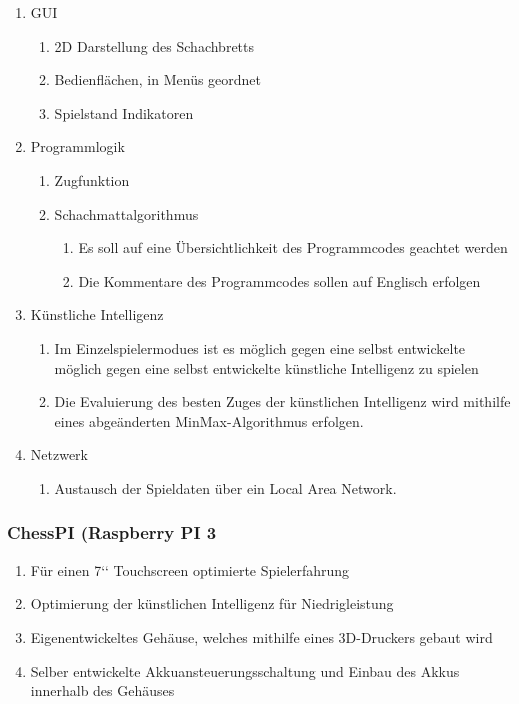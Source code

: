 \documentclass[12pt,a4paper]{article}
\begin{document}
{\begin{enumerate}
	\item{GUI}
	\begin{enumerate}
		\item{2D Darstellung des Schachbretts}
		\item{Bedienflächen, in Menüs geordnet}
		\item{Spielstand Indikatoren}
	\end{enumerate}
	\item{Programmlogik}
	\begin{enumerate}
		\item{Zugfunktion}
		\item{Schachmattalgorithmus}
		\begin{enumerate}
			\item{Es soll auf eine Übersichtlichkeit des Programmcodes geachtet werden}
			\item{Die Kommentare des Programmcodes sollen auf Englisch erfolgen}
		\end{enumerate}
	\end{enumerate}
	\item{Künstliche Intelligenz}
	\begin{enumerate}
		\item{Im Einzelspielermodues ist es möglich gegen eine selbst entwickelte möglich gegen eine selbst entwickelte künstliche Intelligenz zu spielen}
		\item{Die Evaluierung des besten Zuges der künstlichen Intelligenz wird mithilfe eines abgeänderten MinMax-Algorithmus erfolgen.}
	\end{enumerate}
	\item{Netzwerk}
	\begin{enumerate}
		\item{Austausch der Spieldaten über ein Local Area Network.}
	\end{enumerate}
\end{enumerate}

\subsubsection{ChessPI (Raspberry PI 3}

\begin{enumerate}
	\item{Für einen 7‘‘ Touchscreen optimierte Spielerfahrung}
	\item{Optimierung der künstlichen Intelligenz für Niedrigleistung}
	\item{Eigenentwickeltes Gehäuse, welches mithilfe eines 3D-Druckers gebaut wird}
	\item{Selber entwickelte Akkuansteuerungsschaltung und Einbau des Akkus innerhalb des Gehäuses}
\end{enumerate}

}
\end{document}
